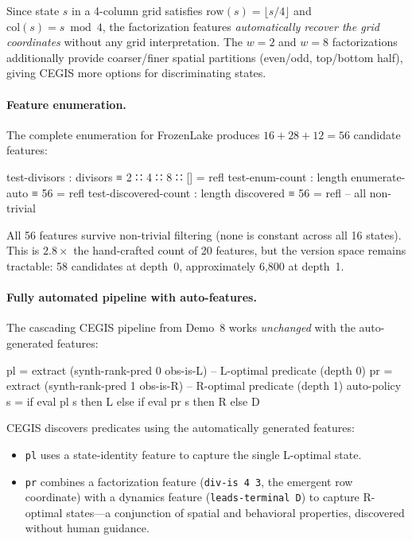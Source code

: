 \noindent Since state $s$ in a 4-column grid satisfies $\text{row}(s) = \lfloor s/4 \rfloor$ and $\text{col}(s) = s \bmod 4$, the factorization features \emph{automatically recover the grid coordinates} without any grid interpretation.  The $w = 2$ and $w = 8$ factorizations additionally provide coarser/finer spatial partitions (even/odd, top/bottom half), giving CEGIS more options for discriminating states.

\paragraph{Feature enumeration.}
The complete enumeration for FrozenLake produces $16 + 28 + 12 = 56$ candidate features:

\begin{spec}
test-divisors       : divisors        ≡ 2 ∷ 4 ∷ 8 ∷ []     = refl
test-enum-count     : length enumerate-auto ≡ 56            = refl
test-discovered-count : length discovered   ≡ 56            = refl   -- all non-trivial
\end{spec}

\noindent All 56 features survive non-trivial filtering (none is constant across all 16 states).  This is $2.8\times$ the hand-crafted count of 20 features, but the version space remains tractable: 58 candidates at depth~0, approximately 6{,}800 at depth~1.

\paragraph{Fully automated pipeline with auto-features.}
The cascading CEGIS pipeline from Demo~8 works \emph{unchanged} with the auto-generated features:

\begin{spec}
pl = extract (synth-rank-pred 0 obs-is-L)          -- L-optimal predicate (depth 0)
pr = extract (synth-rank-pred 1 obs-is-R)          -- R-optimal predicate (depth 1)
auto-policy s = if eval pl s then L else if eval pr s then R else D
\end{spec}

\noindent CEGIS discovers predicates using the automatically generated features:
\begin{itemize}
\item \texttt{pl} uses a state-identity feature to capture the single L-optimal state.
\item \texttt{pr} combines a factorization feature (\texttt{div-is~4~3}, the emergent row coordinate) with a dynamics feature (\texttt{leads-terminal~D}) to capture R-optimal states---a conjunction of spatial and behavioral properties, discovered without human guidance.
\end{itemize}

